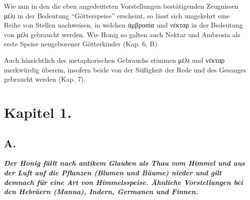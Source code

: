 \documentclass[a4paper, 11pt, oneside]{article}
\begin{document}
Wie nun in den die eben angedeuteten Vorstellungen bestätigenden Zeugnissen μέλι in der Bedeutung "`Götterspeise"' erscheint, so lässt sich umgekehrt eine Reihe von Stellen nachweisen, in welchen ἀμβροσία und νέκταρ in der Bedeutung von μέλι gebraucht werden. Wie Honig so galten auch Nektar und Ambrosia als erste Speise neugeborener Götterkinder (Kap. 6, B).

Auch hinsichtlich des metaphorischen Gebrauchs stimmen μέλι und νέκταρ merkwürdig überein, insofern beide von der Süßigkeit der Rede und des Gesanges gebraucht werden (Kap. 7).
\clearpage
\section{Kapitel 1.}
\subsection{A.}
\begin{center}
\textbf{\emph{Der Honig fällt nach antikem Glauben als Thau vom Himmel und aus der Luft auf die Pflanzen (Blumen und Bäume) nieder und gilt demnach für eine Art von Himmelsspeise. Ähnliche Vorstellungen bei den Hebräern (Manna), Indern, Germanen und Finnen.}}
\end{center}
\end{document}
